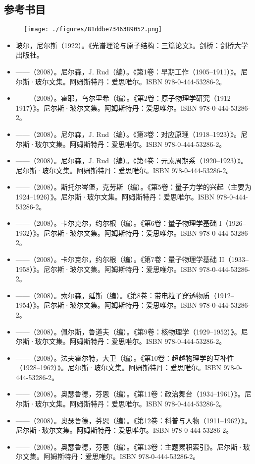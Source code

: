 \subsection{参考书目}
\begin{figure}[ht]
\centering
\texttt{[image: ./figures/81ddbe7346389052.png]}
\caption{} \label{fig_NRSbr_12}
\end{figure}
\begin{itemize}
\item 玻尔，尼尔斯（1922）。《光谱理论与原子结构：三篇论文》。剑桥：剑桥大学出版社。
\item ——（2008）。尼尔森，J. Rud（编）。《第1卷：早期工作（1905–1911）》。尼尔斯·玻尔文集。阿姆斯特丹：爱思唯尔。ISBN 978-0-444-53286-2。
\item ——（2008）。霍耶，乌尔里希（编）。《第2卷：原子物理学研究（1912–1917）》。尼尔斯·玻尔文集。阿姆斯特丹：爱思唯尔。ISBN 978-0-444-53286-2。
\item ——（2008）。尼尔森，J. Rud（编）。《第3卷：对应原理（1918–1923）》。尼尔斯·玻尔文集。阿姆斯特丹：爱思唯尔。ISBN 978-0-444-53286-2。
\item ——（2008）。尼尔森，J. Rud（编）。《第4卷：元素周期系（1920–1923）》。尼尔斯·玻尔文集。阿姆斯特丹：爱思唯尔。ISBN 978-0-444-53286-2。
\item  ——（2008）。斯托尔岑堡，克劳斯（编）。《第5卷：量子力学的兴起（主要为1924–1926）》。尼尔斯·玻尔文集。阿姆斯特丹：爱思唯尔。ISBN 978-0-444-53286-2。
\item ——（2008）。卡尔克尔，约尔根（编）。《第6卷：量子物理学基础 I（1926–1932）》。尼尔斯·玻尔文集。阿姆斯特丹：爱思唯尔。ISBN 978-0-444-53286-2。
\item ——（2008）。卡尔克尔，约尔根（编）。《第7卷：量子物理学基础 II（1933–1958）》。尼尔斯·玻尔文集。阿姆斯特丹：爱思唯尔。ISBN 978-0-444-53286-2。
\item ——（2008）。索尔森，延斯（编）。《第8卷：带电粒子穿透物质（1912–1954）》。尼尔斯·玻尔文集。阿姆斯特丹：爱思唯尔。ISBN 978-0-444-53286-2。
\item ——（2008）。佩尔斯，鲁道夫（编）。《第9卷：核物理学（1929–1952）》。尼尔斯·玻尔文集。阿姆斯特丹：爱思唯尔。ISBN 978-0-444-53286-2。
\item ——（2008）。法夫霍尔特，大卫（编）。《第10卷：超越物理学的互补性（1928–1962）》。尼尔斯·玻尔文集。阿姆斯特丹：爱思唯尔。ISBN 978-0-444-53286-2。
\item ——（2008）。奥瑟鲁德，芬恩（编）。《第11卷：政治舞台（1934–1961）》。尼尔斯·玻尔文集。阿姆斯特丹：爱思唯尔。ISBN 978-0-444-53286-2。
\item ——（2008）。奥瑟鲁德，芬恩（编）。《第12卷：科普与人物（1911–1962）》。尼尔斯·玻尔文集。阿姆斯特丹：爱思唯尔。ISBN 978-0-444-53286-2。
\item ——（2008）。奥瑟鲁德，芬恩（编）。《第13卷：主题累积索引》。尼尔斯·玻尔文集。阿姆斯特丹：爱思唯尔。ISBN 978-0-444-53286-2。
\end{itemize}
